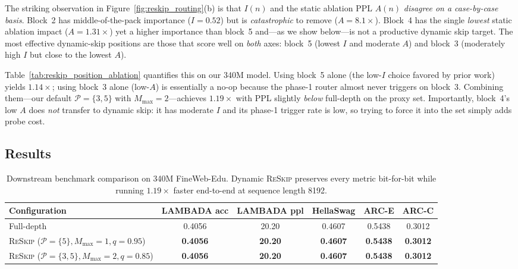 \documentclass{article}
\newcommand{\reskip}{\textsc{ReSkip}}
\begin{document}
The striking observation in Figure~\ref{fig:reskip_routing}(b) is that $I(n)$ and the static ablation PPL $A(n)$ \emph{disagree on a case-by-case basis}. Block~2 has middle-of-the-pack importance ($I{=}0.52$) but is \emph{catastrophic} to remove (${A{=}8.1\times}$). Block~4 has the single \emph{lowest} static ablation impact (${A{=}1.31\times}$) yet a higher importance than block~5 and---as we show below---is not a productive dynamic skip target. The most effective dynamic-skip positions are those that score well on \emph{both} axes: block~5 (lowest $I$ and moderate $A$) and block~3 (moderately high $I$ but close to the lowest $A$).

Table~\ref{tab:reskip_position_ablation} quantifies this on our 340M model. Using block~5 alone (the low-$I$ choice favored by prior work) yields $1.14\times$; using block~3 alone (low-$A$) is essentially a no-op because the phase-1 router almost never triggers on block~3. Combining them---our default $\mathcal{P}{=}\{3,5\}$ with $M_{\max}{=}2$---achieves $1.19\times$ with PPL slightly \emph{below} full-depth on the proxy set. Importantly, block~4's low $A$ does \emph{not} transfer to dynamic skip: it has moderate $I$ and its phase-1 trigger rate is low, so trying to force it into the set simply adds probe cost.

\subsection{Results}
\label{sec:reskip_results}

\begin{table}[t]
\caption{Downstream benchmark comparison on 340M FineWeb-Edu. Dynamic \reskip{} preserves every metric bit-for-bit while running $1.19\times$ faster end-to-end at sequence length 8192.}
\label{tab:reskip_benchmark}
\centering
\begin{tabular}{lccccc}
\toprule
\textbf{Configuration} & \textbf{LAMBADA acc} & \textbf{LAMBADA ppl} & \textbf{HellaSwag} & \textbf{ARC-E} & \textbf{ARC-C} \\
\midrule
Full-depth & 0.4056 & 20.20 & 0.4607 & 0.5438 & 0.3012 \\
\reskip{} ($\mathcal{P}{=}\{5\}, M_{\max}{=}1, q{=}0.95$) & \textbf{0.4056} & \textbf{20.20} & \textbf{0.4607} & \textbf{0.5438} & \textbf{0.3012} \\
\reskip{} ($\mathcal{P}{=}\{3,5\}, M_{\max}{=}2, q{=}0.85$) & \textbf{0.4056} & \textbf{20.20} & \textbf{0.4607} & \textbf{0.5438} & \textbf{0.3012} \\
\bottomrule
\end{tabular}
\end{table}
\end{document}
